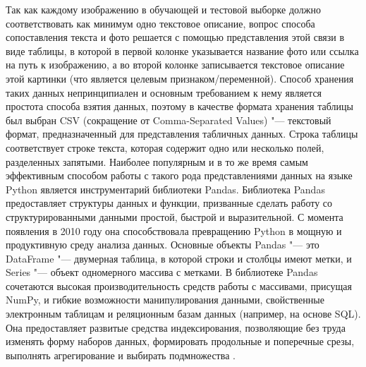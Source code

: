 \documentclass[bachelor, och, coursework]{SCWorks}
\begin{document}
        Так как каждому изображению в обучающей и тестовой выборке должно
        соответствовать как минимум одно текстовое описание, вопрос способа
        сопоставления текста и фото решается с помощью представления этой связи
        в виде таблицы, в которой в первой колонке указывается название фото или
        ссылка на путь к изображению, а во второй колонке записывается текстовое
        описание этой картинки (что является целевым признаком/переменной).
        Способ хранения таких данных непринципиален и основным требованием к
        нему является простота способа взятия данных, поэтому в качестве формата
        хранения таблицы был выбран CSV (сокращение от Comma-Separated Values)
        "--- текстовый формат, предназначенный для представления табличных
        данных. Строка таблицы соответствует строке текста, которая содержит
        одно или несколько полей, разделенных запятыми. Наиболее популярным и в
        то же время самым эффективным способом работы с такого рода
        представлениями данных на языке Python является инструментарий
        библиотеки Pandas. Библиотека Pandas предоставляет структуры данных и
        функции, призванные сделать работу со структурированными данными
        простой, быстрой и выразительной. С момента появления в 2010 году она
        способствовала превращению Python в мощную и продуктивную среду анализа
        данных. Основные объекты Pandas "--- это DataFrame "--- двумерная
        таблица, в  которой строки и столбцы имеют метки, и Series "--- объект
        одномерного массива с  метками. В библиотеке Pandas сочетаются высокая
        производительность средств работы с массивами, присущая NumPy, и гибкие
        возможности манипулирования данными, свойственные электронным таблицам и
        реляционным базам данных (например, на основе SQL). Она предоставляет
        развитые средства индексирования, позволяющие без труда изменять форму
        наборов данных, формировать продольные и  поперечные срезы, выполнять
        агрегирование и выбирать подмножества \cite{pandas}.
        
\end{document}
